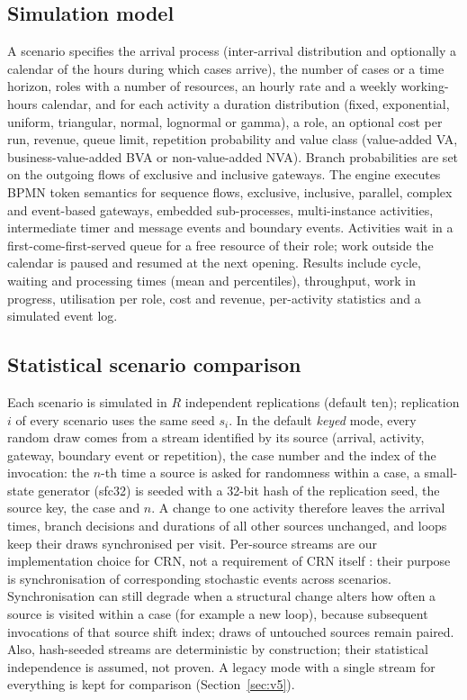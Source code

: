 \documentclass[preprint,12pt,nonatbib]{elsarticle}
\begin{document}
\subsection{Simulation model}
A scenario specifies the arrival process (inter-arrival distribution and optionally a calendar of the hours during which cases arrive), the number of cases or a time horizon, roles with a number of resources, an hourly rate and a weekly working-hours calendar, and for each activity a duration distribution (fixed, exponential, uniform, triangular, normal, lognormal or gamma), a role, an optional cost per run, revenue, queue limit, repetition probability and value class (value-added VA, business-value-added BVA or non-value-added NVA). Branch probabilities are set on the outgoing flows of exclusive and inclusive gateways. The engine executes BPMN token semantics for sequence flows, exclusive, inclusive, parallel, complex and event-based gateways, embedded sub-processes, multi-instance activities, intermediate timer and message events and boundary events. Activities wait in a first-come-first-served queue for a free resource of their role; work outside the calendar is paused and resumed at the next opening. Results include cycle, waiting and processing times (mean and percentiles), throughput, work in progress, utilisation per role, cost and revenue, per-activity statistics and a simulated event log.

\subsection{Statistical scenario comparison}
\label{sec:stats}
Each scenario is simulated in $R$ independent replications (default ten); replication $i$ of every scenario uses the same seed $s_i$. In the default \emph{keyed} mode, every random draw comes from a stream identified by its source (arrival, activity, gateway, boundary event or repetition), the case number and the index of the invocation: the $n$-th time a source is asked for randomness within a case, a small-state generator (sfc32) is seeded with a 32-bit hash of the replication seed, the source key, the case and $n$. A change to one activity therefore leaves the arrival times, branch decisions and durations of all other sources unchanged, and loops keep their draws synchronised per visit. Per-source streams are our implementation choice for CRN, not a requirement of CRN itself \citep{nelson1995}: their purpose is synchronisation of corresponding stochastic events across scenarios. Synchronisation can still degrade when a structural change alters how often a source is visited within a case (for example a new loop), because subsequent invocations of that source shift index; draws of untouched sources remain paired. Also, hash-seeded streams are deterministic by construction; their statistical independence is assumed, not proven. A legacy mode with a single stream for everything is kept for comparison (Section~\ref{sec:v5}).
\end{document}
